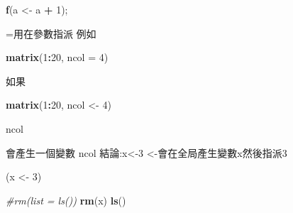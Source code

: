 \documentclass[]{book}
\newenvironment{Shaded}{\begin{snugshade}}{\end{snugshade}}
\newcommand{\KeywordTok}[1]{\textcolor[rgb]{0.13,0.29,0.53}{\textbf{#1}}}
\newcommand{\DataTypeTok}[1]{\textcolor[rgb]{0.13,0.29,0.53}{#1}}
\newcommand{\DecValTok}[1]{\textcolor[rgb]{0.00,0.00,0.81}{#1}}
\newcommand{\StringTok}[1]{\textcolor[rgb]{0.31,0.60,0.02}{#1}}
\newcommand{\CommentTok}[1]{\textcolor[rgb]{0.56,0.35,0.01}{\textit{#1}}}
\newcommand{\OperatorTok}[1]{\textcolor[rgb]{0.81,0.36,0.00}{\textbf{#1}}}
\newcommand{\NormalTok}[1]{#1}
\theoremstyle{definition}
\theoremstyle{definition}
\theoremstyle{definition}
\theoremstyle{remark}
\begin{document}
\begin{Shaded}
\begin{Highlighting}[]
\KeywordTok{f}\NormalTok{(a <-}\StringTok{ }\NormalTok{a }\OperatorTok{+}\StringTok{ }\DecValTok{1}\NormalTok{);}
\end{Highlighting}
\end{Shaded}

\begin{Shaded}
\end{Shaded}

=用在參數指派 例如

\begin{Shaded}
\begin{Highlighting}[]
\KeywordTok{matrix}\NormalTok{(}\DecValTok{1}\OperatorTok{:}\DecValTok{20}\NormalTok{, }\DataTypeTok{ncol =} \DecValTok{4}\NormalTok{)}
\end{Highlighting}
\end{Shaded}

如果

\begin{Shaded}
\begin{Highlighting}[]
\KeywordTok{matrix}\NormalTok{(}\DecValTok{1}\OperatorTok{:}\DecValTok{20}\NormalTok{, ncol <-}\StringTok{ }\DecValTok{4}\NormalTok{)}
\end{Highlighting}
\end{Shaded}

\begin{Shaded}
\begin{Highlighting}[]
\NormalTok{ncol}
\end{Highlighting}
\end{Shaded}

會產生一個變數 ncol 結論:x\textless{}-3
\textless{}-會在全局產生變數x然後指派3

\begin{Shaded}
\begin{Highlighting}[]
\NormalTok{(x <-}\StringTok{ }\DecValTok{3}\NormalTok{)}
\end{Highlighting}
\end{Shaded}

\begin{Shaded}
\begin{Highlighting}[]
\CommentTok{#rm(list = ls())}
\KeywordTok{rm}\NormalTok{(x)}
\KeywordTok{ls}\NormalTok{()}
\end{Highlighting}
\end{Shaded}
\end{document}
